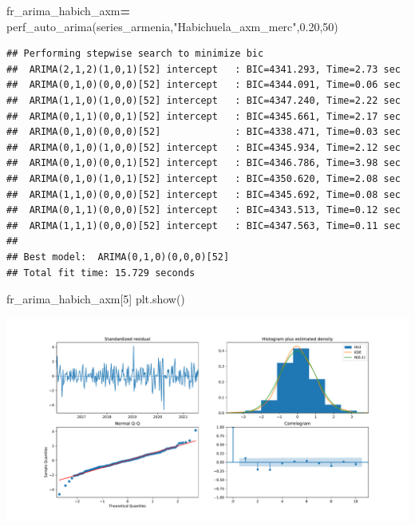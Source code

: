 \documentclass[
]{book}
\newenvironment{Shaded}{\begin{snugshade}}{\end{snugshade}}
\newcommand{\DecValTok}[1]{\textcolor[rgb]{0.00,0.00,0.81}{#1}}
\newcommand{\FloatTok}[1]{\textcolor[rgb]{0.00,0.00,0.81}{#1}}
\newcommand{\NormalTok}[1]{#1}
\newcommand{\OperatorTok}[1]{\textcolor[rgb]{0.81,0.36,0.00}{\textbf{#1}}}
\newcommand{\StringTok}[1]{\textcolor[rgb]{0.31,0.60,0.02}{#1}}
\begin{document}
\begin{Shaded}
\begin{Highlighting}[]

\NormalTok{fr\_arima\_habich\_axm}\OperatorTok{=}\NormalTok{ perf\_auto\_arima(series\_armenia,}\StringTok{"Habichuela\_axm\_merc"}\NormalTok{,}\FloatTok{0.20}\NormalTok{,}\DecValTok{50}\NormalTok{)}
\end{Highlighting}
\end{Shaded}

\begin{verbatim}
## Performing stepwise search to minimize bic
##  ARIMA(2,1,2)(1,0,1)[52] intercept   : BIC=4341.293, Time=2.73 sec
##  ARIMA(0,1,0)(0,0,0)[52] intercept   : BIC=4344.091, Time=0.06 sec
##  ARIMA(1,1,0)(1,0,0)[52] intercept   : BIC=4347.240, Time=2.22 sec
##  ARIMA(0,1,1)(0,0,1)[52] intercept   : BIC=4345.661, Time=2.17 sec
##  ARIMA(0,1,0)(0,0,0)[52]             : BIC=4338.471, Time=0.03 sec
##  ARIMA(0,1,0)(1,0,0)[52] intercept   : BIC=4345.934, Time=2.12 sec
##  ARIMA(0,1,0)(0,0,1)[52] intercept   : BIC=4346.786, Time=3.98 sec
##  ARIMA(0,1,0)(1,0,1)[52] intercept   : BIC=4350.620, Time=2.08 sec
##  ARIMA(1,1,0)(0,0,0)[52] intercept   : BIC=4345.692, Time=0.08 sec
##  ARIMA(0,1,1)(0,0,0)[52] intercept   : BIC=4343.513, Time=0.12 sec
##  ARIMA(1,1,1)(0,0,0)[52] intercept   : BIC=4347.563, Time=0.11 sec
## 
## Best model:  ARIMA(0,1,0)(0,0,0)[52]          
## Total fit time: 15.729 seconds
\end{verbatim}

\begin{Shaded}
\begin{Highlighting}[]
\NormalTok{fr\_arima\_habich\_axm[}\DecValTok{5}\NormalTok{]}
\NormalTok{plt.show()}
\end{Highlighting}
\end{Shaded}

\includegraphics{bookdown-demo_files/figure-latex/unnamed-chunk-154-143.pdf}
\end{document}

